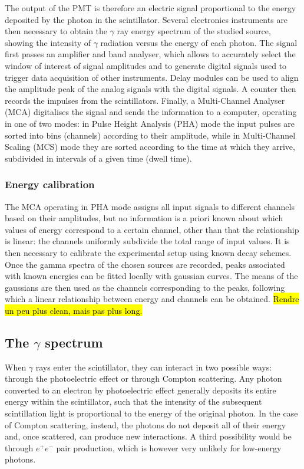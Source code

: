 The output of the PMT is therefore an electric signal proportional to the energy deposited by the photon in the scintillator.
Several electronics instruments are then necessary to obtain the $\gamma$ ray energy spectrum of the studied source, 
showing the intensity of $\gamma$ radiation versus the energy of each photon.
The signal first passes an amplifier and band analyser, which allows to accurately select the window of interest of signal amplitudes and to generate digital signals used to trigger data acquisition of other instruments.
Delay modules can be used to align the amplitude peak of the analog signals with the digital signals.
A counter then records the impulses from the scintillators.
Finally, a Multi-Channel Analyser (MCA) digitalises the signal and sends the information to a computer, operating in one of two modes: 
in Pulse Height Analysis (PHA) mode the input pulses are
sorted into bins (channels) according to their amplitude, while in Multi-Channel Scaling (MCS) mode they are sorted according to the time at which they arrive, subdivided in intervals of a given time (dwell time).


\subsubsection{Energy calibration}
\label{sec:energy_calibration}

The MCA operating in PHA mode assigns all input signals to different channels based on their amplitudes, 
but no information is a priori known about which values of energy correspond to a certain channel,
other than that the relationship is linear: 
the channels uniformly subdivide the total range of input values.
It is then necessary to calibrate the experimental setup using known decay schemes.
Once the gamma spectra of the chosen sources are recorded, peaks associated with known energies can be fitted locally with gaussian curves.
The means of the gaussians are then used as the channels corresponding to the peaks, following which a linear relationship between energy and channels can be obtained. \hl{Rendre un peu plus clean, mais pas plus long.}


\subsection{The $\gamma$ spectrum}
\label{sec:spectrum}

When $\gamma$ rays enter the scintillator, they can interact in two possible ways: through the photoelectric effect or through Compton scattering.
Any photon converted to an electron by photoelectric effect generally deposits its entire energy within the scintillator, such that the intensity of the subsequent scintillation light is proportional to the energy of the original photon.
In the case of Compton scattering, instead, the photons do not deposit all of their energy and, once scattered, can produce new interactions.
A third possibility would be through $e^+ e^-$ pair production, which is however very unlikely for low-energy photons.

